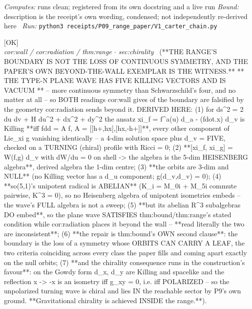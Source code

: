 \begin{description}
\emph{Computes:} runs clean; registered from its own docstring and a live run
 \emph{Bound:} description is the receipt's own wording, condensed; not independently re-derived here
\ \emph{Run:} \texttt{python3 receipts/P09\_range\_paper/V1\_carter\_chain.py}
\item[\label{rcpt:P09_the_wall_is_not_the_loss_of_symmetry}\texttt{P09\_the\_wall\_is\_not\_the\_loss\_of\_symmetry}]\hfill\textsf{[OK]}\\
\textit{cor:wall / cor:radiation / thm:range \ensuremath{\cdot} sec:chirality} \ (**THE RANGE'S BOUNDARY IS NOT THE LOSS OF CONTINUOUS SYMMETRY, AND THE PAPER'S OWN BEYOND-THE-WALL EXEMPLAR IS THE WITNESS.** ** THE TYPE-N PLANE WAVE HAS FIVE KILLING VECTORS AND IS VACUUM ** -- more continuous symmetry than Schwarzschild's four, and no matter at all -- so BOTH readings cor:wall gives of the boundary are falsified by the geometry cor:radiation sends beyond it. DERIVED HERE: (1) for ds\textasciicircum{}2 = 2 du dv + H du\textasciicircum{}2 + dx\textasciicircum{}2 + dy\textasciicircum{}2 the ansatz xi\_f = f\textasciicircum{}a(u) d\_a - (fdot.x) d\_v is Killing **iff fdd = A f, A = [[h+,hx],[hx,-h+]]**, every other component of Lie\_xi g vanishing identically -- a 4-dim solution space plus d\_v = FIVE, checked on a TURNING (chiral) profile with Ricci = 0; (2) **[xi\_f, xi\_g] = W(f,g) d\_v with dW/du = 0 on shell -> the algebra is the 5-dim HEISENBERG algebra**, derived algebra the 1-dim centre; (3) **the orbits are 3-dim and NULL** (no Killing vector has a d\_u component; g(d\_v,d\_v) = 0); (4) **so(5,1)'s unipotent radical is ABELIAN** (K\_i = M\_0i + M\_5i commute pairwise, K\textasciicircum{}3 = 0), so no Heisenberg algebra of unipotent isometries embeds -- the wave's FULL algebra is not a sweep; (5) **but its abelian R\textasciicircum{}3 subalgebras DO embed**, so the plane wave SATISFIES thm:bound/thm:range's stated condition while cor:radiation places it beyond the wall -- **read literally the two are inconsistent**; (6) **the repair is thm:bound's OWN second clause**: the boundary is the loss of a symmetry whose ORBITS CAN CARRY A LEAF, the two criteria coinciding across every class the paper fills and coming apart exactly on the null orbits; (7) **and the chirality consequence runs in the construction's favour**: on the Gowdy form d\_x, d\_y are Killing and spacelike and the reflection x -> -x is an isometry iff g\_xy = 0, i.e. iff POLARIZED -- so the unpolarized turning wave is chiral and lies IN the reachable sector by P9's own ground. **Gravitational chirality is achieved INSIDE the range.**). 

\end{description}
